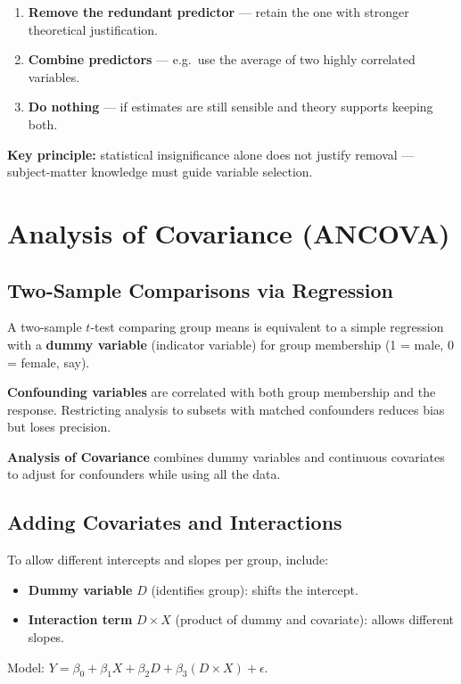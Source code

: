\documentclass[12pt, a4paper]{article}
\begin{document}
\begin{enumerate}
  \item \textbf{Remove the redundant predictor} — retain the one with stronger theoretical justification.
  \item \textbf{Combine predictors} — e.g.\ use the average of two highly correlated variables.
  \item \textbf{Do nothing} — if estimates are still sensible and theory supports keeping both.
\end{enumerate}

\textbf{Key principle:} statistical insignificance alone does not justify removal — subject-matter knowledge must guide variable selection.

\section{Analysis of Covariance (ANCOVA)}

\subsection{Two-Sample Comparisons via Regression}

A two-sample $t$-test comparing group means is equivalent to a simple regression with a \textbf{dummy variable} (indicator variable) for group membership (1 = male, 0 = female, say).

\textbf{Confounding variables} are correlated with both group membership and the response. Restricting analysis to subsets with matched confounders reduces bias but loses precision.

\textbf{Analysis of Covariance} combines dummy variables and continuous covariates to adjust for confounders while using all the data.

\subsection{Adding Covariates and Interactions}

To allow different intercepts and slopes per group, include:
\begin{itemize}
  \item \textbf{Dummy variable} $D$ (identifies group): shifts the intercept.
  \item \textbf{Interaction term} $D \times X$ (product of dummy and covariate): allows different slopes.
\end{itemize}
Model: $Y = \beta_0 + \beta_1 X + \beta_2 D + \beta_3 (D \times X) + \epsilon$.
\end{document}
